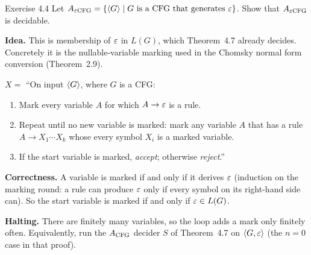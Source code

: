 \begin{question}{Exercise 4.4}
Let $A_{\varepsilon\mathrm{CFG}}=\{\langle G\rangle\mid\text{$G$ is a CFG that generates $\varepsilon$}\}$. Show that $A_{\varepsilon\mathrm{CFG}}$ is decidable.
\end{question}
\begin{soln}
\textbf{Idea.} This is membership of $\varepsilon$ in $L(G)$, which Theorem~4.7 already decides. Concretely it is the nullable-variable marking used in the Chomsky normal form conversion (Theorem~2.9).

$X=$ ``On input $\langle G\rangle$, where $G$ is a CFG:
\begin{enumerate}
\item Mark every variable $A$ for which $A\to\varepsilon$ is a rule.
\item Repeat until no new variable is marked: mark any variable $A$ that has a rule $A\to X_1\cdots X_k$ whose every symbol $X_i$ is a marked variable.
\item If the start variable is marked, \emph{accept}; otherwise \emph{reject}.''
\end{enumerate}

\textbf{Correctness.} A variable is marked if and only if it derives $\varepsilon$ (induction on the marking round: a rule can produce $\varepsilon$ only if every symbol on its right-hand side can). So the start variable is marked if and only if $\varepsilon\in L(G)$.

\textbf{Halting.} There are finitely many variables, so the loop adds a mark only finitely often. Equivalently, run the $A_{\mathrm{CFG}}$ decider $S$ of Theorem~4.7 on $\langle G,\varepsilon\rangle$ (the $n=0$ case in that proof).
\end{soln}

